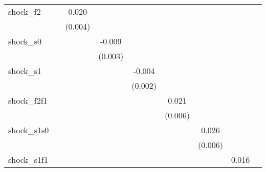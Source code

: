 {\begin{tabular}{l*{8}{c}}
\addlinespace
shock\_f2    &                     &       0.020\sym{***}&                     &                     &                     &                     &                     &                     \\
            &                     &     (0.004)         &                     &                     &                     &                     &                     &                     \\
\addlinespace
shock\_s0    &                     &                     &      -0.009\sym{***}&                     &                     &                     &                     &                     \\
            &                     &                     &     (0.003)         &                     &                     &                     &                     &                     \\
\addlinespace
shock\_s1    &                     &                     &                     &      -0.004\sym{*}  &                     &                     &                     &                     \\
            &                     &                     &                     &     (0.002)         &                     &                     &                     &                     \\
\addlinespace
shock\_f2f1  &                     &                     &                     &                     &       0.021\sym{***}&                     &                     &                     \\
            &                     &                     &                     &                     &     (0.006)         &                     &                     &                     \\
\addlinespace
shock\_s1s0  &                     &                     &                     &                     &                     &       0.026\sym{***}&                     &                     \\
            &                     &                     &                     &                     &                     &     (0.006)         &                     &                     \\
\addlinespace
shock\_s1f1  &                     &                     &                     &                     &                     &                     &       0.016\sym{**} &                     \\

\end{tabular}}
